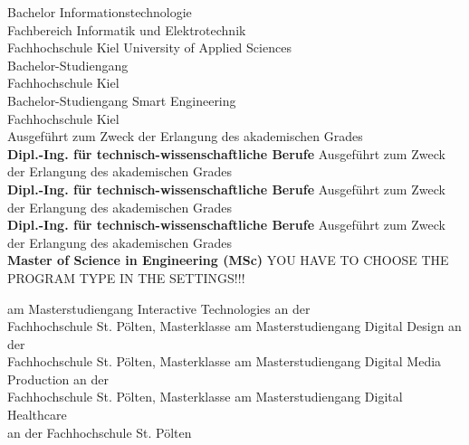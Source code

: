 \begin{center}
\vspace{1.3cm}
\ifuseBachelorMediaTechnologiesOne
	\fontsize{11pt}{15pt}\selectfont Bachelor Informationstechnologie\\
	Fachbereich Informatik und Elektrotechnik\\
Fachhochschule Kiel University of Applied Sciences\\  
\else
	\ifuseBachelorMediaTechnologiesTwo
		\fontsize{11pt}{15pt}\selectfont Bachelor-Studiengang \\
Fachhochschule Kiel\\  
\else
	\ifuseBachelorSmartEngineeringOne
    	\fontsize{11pt}{15pt}\selectfont Bachelor-Studiengang Smart Engineering\\
Fachhochschule Kiel\\ 
\else
	\ifuseMasterInteractiveTechnologies
		\fontsize{11pt}{15pt}\selectfont Ausgeführt zum Zweck der Erlangung des akademischen Grades\\
		\textbf{Dipl.-Ing. für technisch-wissenschaftliche Berufe}
\else
	\ifuseMasterDigitalDesign
		\fontsize{11pt}{15pt}\selectfont Ausgeführt zum Zweck der Erlangung des akademischen Grades\\
		\textbf{Dipl.-Ing. für technisch-wissenschaftliche Berufe}	
\else
    \ifuseMasterDigitalMediaProduction
		\fontsize{11pt}{15pt}\selectfont Ausgeführt zum Zweck der Erlangung des akademischen Grades\\
		\textbf{Dipl.-Ing. für technisch-wissenschaftliche Berufe}	
\else
	\ifuseMasterDigitalHealthCare
    	\fontsize{11pt}{15pt}\selectfont Ausgeführt zum Zweck der Erlangung des akademischen Grades\\
		\textbf{Master of Science in Engineering (MSc)}
    \else
        \LARGE{YOU HAVE TO CHOOSE THE PROGRAM TYPE IN THE SETTINGS!!!}
\fi\fi\fi\fi\fi\fi\fi

\vspace{4mm}

\ifuseMasterInteractiveTechnologies
	am Masterstudiengang Interactive Technologies an der\\ 
Fachhochschule St. Pölten, Masterklasse \specialization
\else
    \ifuseMasterDigitalDesign
	am Masterstudiengang Digital Design an der\\ 
Fachhochschule St. Pölten, Masterklasse \specialization
\else
    \ifuseMasterDigitalMediaProduction
	am Masterstudiengang Digital Media Production an der\\ 
Fachhochschule St. Pölten, Masterklasse \specialization
\else
	\ifuseMasterDigitalHealthCare
		am Masterstudiengang Digital Healthcare\\ 
an der Fachhochschule St. Pölten
    \else
        

\end{center}
